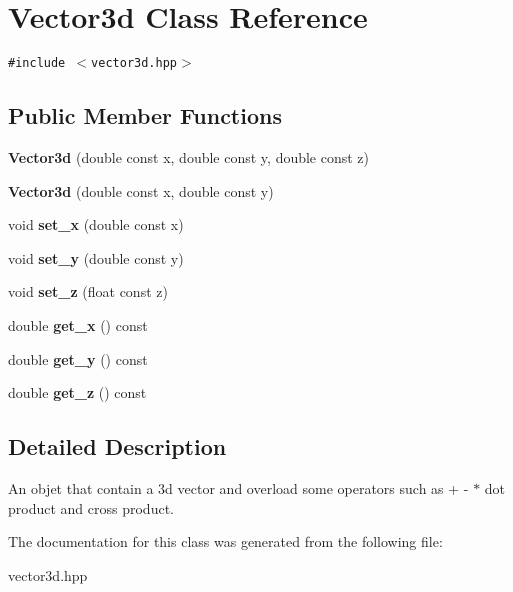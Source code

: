 \section{Vector3d Class Reference}
\label{classVector3d}
{\tt \#include $<$vector3d.hpp$>$}

\subsection*{Public Member Functions}
\begin{CompactItemize}
\item 
{\bf Vector3d} (double const x, double const y, double const z)\label{classVector3d_a1}

\item 
{\bf Vector3d} (double const x, double const y)\label{classVector3d_a2}

\item 
void {\bf set\_\-x} (double const x)\label{classVector3d_a3}

\item 
void {\bf set\_\-y} (double const y)\label{classVector3d_a4}

\item 
void {\bf set\_\-z} (float const z)\label{classVector3d_a5}

\item 
double {\bf get\_\-x} () const \label{classVector3d_a6}

\item 
double {\bf get\_\-y} () const \label{classVector3d_a7}

\item 
double {\bf get\_\-z} () const \label{classVector3d_a8}

\end{CompactItemize}


\subsection{Detailed Description}
An objet that contain a 3d vector and overload some operators such as + - $\ast$ dot product and cross product. 



The documentation for this class was generated from the following file:\begin{CompactItemize}
\item 
vector3d.hpp\end{CompactItemize}
